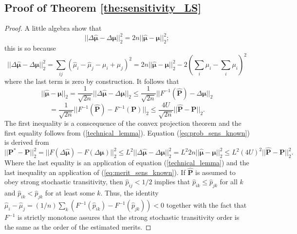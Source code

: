 \documentclass[twoside,11pt]{article}
\begin{document}
\subsection{Proof of Theorem \ref{the:sensitivity_LS}}
\label{sec:proof_the_sensitivity_LS}
\begin{proof} 
A little algebra show that \begin{equation}
\label{technical_lemma}||\Delta\boldsymbol{\hat \mu} - \Delta\boldsymbol{\mu}||_2^2 = 2n||\boldsymbol{\hat \mu} - \boldsymbol{\mu}||^2_2;\end{equation}
this is so because
$$||\Delta\boldsymbol{\hat \mu} - \Delta\boldsymbol{\mu}||_2^2 = \sum_{ij}(\hat{\mu}_i - \hat{\mu}_j - \mu_i+\mu_j)^2 = 2n||\boldsymbol{\hat \mu} - \boldsymbol{\mu}||^2_2 - 2 ( \sum_{i}\hat{\mu}_i- \sum_i \mu_i )^2$$%
where the last term is zero by construction. It follows that
$$||\boldsymbol{\hat \mu}-\boldsymbol{\mu}||_2 = \frac{1}{\sqrt{2n}}||\Delta\boldsymbol{\hat \mu}-\Delta\boldsymbol{\mu}||_2  \leq \frac{1}{\sqrt{2n}}||F^{-1}(\boldsymbol{\hat P})-\Delta\boldsymbol{\mu} ||_2 $$
$$=\frac{1}{\sqrt{2n}}||F^{-1}(\boldsymbol{\hat P})-F^{-1}(\boldsymbol{ P})||_2  \leq \frac{4U}{\sqrt{2n}}||\boldsymbol{\hat P}-\boldsymbol{P}||_2.$$ The first inequality is a conscequence of the convex projection theorem and the first  equality follows from (\ref{technical_lemma}). Equation (\ref{eq:prob_sens_known}) is derived from $$||\boldsymbol{P}^*-\boldsymbol{P}||_2^2 = ||F(\Delta \boldsymbol{\hat{\mu}})-F(\Delta \boldsymbol{\mu})||_2^2 \leq L^2 || \Delta \boldsymbol{\hat \mu} -\Delta \boldsymbol{\mu} ||_2^2 = L^2 2 n||\boldsymbol{\hat \mu} - \boldsymbol{\mu}||_2^2 \leq L^2 (4U)^2||\boldsymbol{\hat P} - \boldsymbol{P}||_2^2.$$ Where the last equality is an application of equation (\ref{technical_lemma}) and the last inequality an application of (\ref{eq:merit_sens_known}). If $\boldsymbol{\hat{P}}$ is assumed to obey strong stochastic transitivity, then  $\hat{p}_{ij}<1/2$ implies that $\hat{p}_{ik}\leq \hat{p}_{jk}$ for all $k$ and $\hat{p}_{ik} < \hat{p}_{jk}$ for at least some $k$. Thus, the identity $\hat{\mu}_i - \hat{\mu}_j = (1/n)\sum_k (F^{-1}(\hat{p}_{ik}) - F^{-1}(\hat{p}_{jk}))<0$ together with the fact that $F^{-1}$ is strictly monotone assures that the strong stochastic transitivity order is the same as the order of the estimated merits.
\end{proof}
\end{document}
